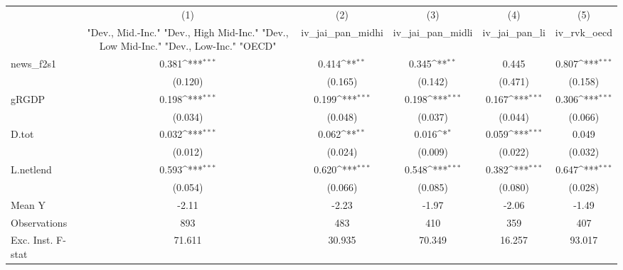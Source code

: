 {
\def\sym#1{\ifmmode^{#1}\else\(^{#1}\)\fi}
\begin{tabular}{l*{5}{c}}
\toprule
            &\multicolumn{1}{c}{(1)}&\multicolumn{1}{c}{(2)}&\multicolumn{1}{c}{(3)}&\multicolumn{1}{c}{(4)}&\multicolumn{1}{c}{(5)}\\
            &\multicolumn{1}{c}{ "Dev., Mid.-Inc." "Dev., High Mid-Inc." "Dev., Low Mid-Inc." "Dev., Low-Inc." "OECD" }&\multicolumn{1}{c}{iv\_jai\_pan\_midhi}&\multicolumn{1}{c}{iv\_jai\_pan\_midli}&\multicolumn{1}{c}{iv\_jai\_pan\_li}&\multicolumn{1}{c}{iv\_rvk\_oecd}\\
\midrule
news\_f2s1   &       0.381\sym{***}&       0.414\sym{**} &       0.345\sym{**} &       0.445         &       0.807\sym{***}\\
            &     (0.120)         &     (0.165)         &     (0.142)         &     (0.471)         &     (0.158)         \\
\addlinespace
gRGDP       &       0.198\sym{***}&       0.199\sym{***}&       0.198\sym{***}&       0.167\sym{***}&       0.306\sym{***}\\
            &     (0.034)         &     (0.048)         &     (0.037)         &     (0.044)         &     (0.066)         \\
\addlinespace
D.tot       &       0.032\sym{***}&       0.062\sym{**} &       0.016\sym{*}  &       0.059\sym{***}&       0.049         \\
            &     (0.012)         &     (0.024)         &     (0.009)         &     (0.022)         &     (0.032)         \\
\addlinespace
L.netlend   &       0.593\sym{***}&       0.620\sym{***}&       0.548\sym{***}&       0.382\sym{***}&       0.647\sym{***}\\
            &     (0.054)         &     (0.066)         &     (0.085)         &     (0.080)         &     (0.028)         \\
\midrule
Mean Y      &       -2.11         &       -2.23         &       -1.97         &       -2.06         &       -1.49         \\
Observations&         893         &         483         &         410         &         359         &         407         \\
Exc. Inst. F-stat&      71.611         &      30.935         &      70.349         &      16.257         &      93.017         \\
\bottomrule
\end{tabular}
}
